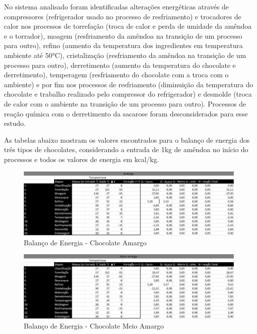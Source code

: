 \documentclass[
	12pt,				%
	openright,			%
	oneside,			%
	a4paper,			%
	english,			%
	french,				%
	spanish,			%
	brazil				%
	]{abntex2}
\begin{document}
No sistema analisado foram identificadas alterações energéticas através de compressores (refrigerador usado no processo de resfriamento) e trocadores de calor nos processos de torrefação (troca de calor e perda de umidade da amêndoa e o torrador), moagem (resfriamento da amêndoa na transição de um processo para outro), refino (aumento da temperatura dos ingredientes em temperatura ambiente até 50°C), cristalização (resfriamento da amêndoa na transição de um processo para outro), derretimento (aumento da temperatura do chocolate e derretimento), temperagem (resfriamento do chocolate com a troca com o ambiente) e por fim nos processos de resfriamento (diminuição da temperatura do chocolate e trabalho realizado pelo compressor do refrigerador) e desmolde (troca de calor com o ambiente na transição de um processo para outro). Processos de reação química com o derretimento da sacarose foram desconsiderados para esse estudo.

As tabelas abaixo mostram os valores encontrados para o balanço de energia dos três tipos de chocolates, considerando a entrada de 1kg de amêndoa no início do processos e todos os valores de energia em kcal/kg.

\begin{figure}[H]
\begin{center}
\caption{Balanço de Energia - Chocolate Amargo}
\includegraphics[scale=0.5]{../../Pictures/amargo.jpg} 
\end{center}
\end{figure}

\begin{figure}[H]
\begin{center}
\caption{Balanço de Energia - Chocolate Meio Amargo}
\includegraphics[scale=0.5]{../../Pictures/meio amargo.jpg} 
\end{center}
\end{figure}
\end{document}
